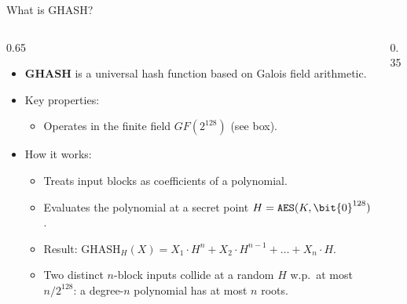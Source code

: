 \ifdefined\PRESENTATION\else\PassOptionsToClass{handout}{beamer}\fi\documentclass[aspectratio=169, lualatex]{beamer}
\begin{document}
\begin{frame}{What is GHASH?}
	\begin{columns}[c]
		\begin{column}{0.65\textwidth}
			\begin{itemize}
				\item \textbf{GHASH} is a universal hash function based on Galois field arithmetic.
				\item Key properties:
				      \begin{itemize}
					      \item Operates in the finite field $GF(2^{128})$ (see box).
				      \end{itemize}
				\item How it works:
				      \begin{itemize}
					      \item Treats input blocks as coefficients of a polynomial.
					      \item Evaluates the polynomial at a secret point $H = \texttt{AES}(K, \bit{0}^{128})$.
					      \item Result: $\text{GHASH}_H(X) = X_1 \cdot H^n + X_2 \cdot H^{n-1} + \ldots + X_n \cdot H$.
					      \item Two distinct $n$-block inputs collide at a random $H$ w.p.\ at most $n/2^{128}$: a degree-$n$ polynomial has at most $n$ roots.
				      \end{itemize}
			\end{itemize}
		\end{column}
		\begin{column}{0.35\textwidth}
		\end{column}
	\end{columns}
\end{frame}
\end{document}
